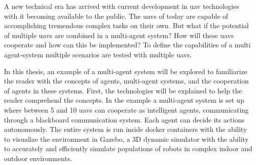 A new technical era has arrived with current development in \acs{uav} technologies with it becoming available to the public. 
The \acsp{uav} of today are capable of accomplishing tremendous complex tasks on their own. But what if the potential of 
multiple \acsp{uav} are combined in a multi-agent system? 
How will these \acsp{uav} cooperate and how can this be implemented? To define the capabilities of a multi agent-system 
multiple scenarios are tested with multiple \acsp{uav}. 

In this thesis, an example of a multi-agent system will be explored to familiarize the reader with the concepts of agents,
multi-agent systems, and the cooperation of agents in these systems. First, the technologies will be explained to help the reader comprehend the concepts.
In the example a multi-agent system is set up where between 5 and 10 \acsp{uav} can cooperate as intelligent agents, communicating through a blackboard communication system. 
Each agent can decide its actions autonomously. The entire system is run inside docker containers with the ability to visualize the environment in Gazebo, 
a 3D dynamic simulator with the ability to accurately and efficiently simulate populations of robots in complex indoor and outdoor environments.
